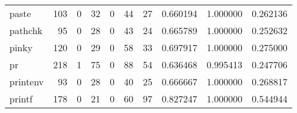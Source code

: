 \begin{longtable}{lrrrrrrrrr}
paste     &                                                103 &                                                  0 &                                                 32 &                                                  0 &                                                 44 &                                                 27 &                                           0.660194 &                               1.000000 &                             0.262136 \\
pathchk   &                                                 95 &                                                  0 &                                                 28 &                                                  0 &                                                 43 &                                                 24 &                                           0.665789 &                               1.000000 &                             0.252632 \\
pinky     &                                                120 &                                                  0 &                                                 29 &                                                  0 &                                                 58 &                                                 33 &                                           0.697917 &                               1.000000 &                             0.275000 \\
pr        &                                                218 &                                                  1 &                                                 75 &                                                  0 &                                                 88 &                                                 54 &                                           0.636468 &                               0.995413 &                             0.247706 \\
printenv  &                                                 93 &                                                  0 &                                                 28 &                                                  0 &                                                 40 &                                                 25 &                                           0.666667 &                               1.000000 &                             0.268817 \\
printf    &                                                178 &                                                  0 &                                                 21 &                                                  0 &                                                 60 &                                                 97 &                                           0.827247 &                               1.000000 &                             0.544944 \\

\end{longtable}
